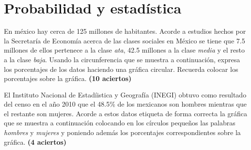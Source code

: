 \documentclass[11pt]{article}
\begin{document}
\section{Probabilidad y estad\'istica}
En m\'exico hay cerca de 125 millones de habitantes. Acorde a estudios hechos
por la Secretar\'ia de Econom\'ia acerca de las clases sociales en M\'exico se
tiene que 7.5 millones de ellos pertenece a la clase \emph{ata}, 42.5 millones a
la clase \emph{media} y el resto a la clase \emph{baja}. Usando la
circunferencia que se muestra a continuaci\'on, expresa los porcentajes de los
datos haciendo una gr\'afica circular. Recuerda colocar los porcentajes sobre la
gr\'afica. \hfill \textbf{(10 aciertos)}

\vspace{3mm}

\vspace{3mm}
El Instituto Nacional de Estad\'iistica y Geograf\'ia (INEGI) obtuvo como
resultado del censo en el a\~no 2010 que el 48.5\% de los mexicanos son hombres
mientras que el restante son mujeres. Acorde a estos datos etiqueta de forma
correcta la gr\'afica que se muestra a continuaci\'on colocando en los
c\'irculos peque\~nos las palabras \emph{hombres} y \emph{mujeres} y
poniendo adem\'as los porcentajes correspondientes sobre la gr\'afica. \hspace{10cm} \textbf{(4 aciertos)}


\vspace{3mm}
\end{document}
